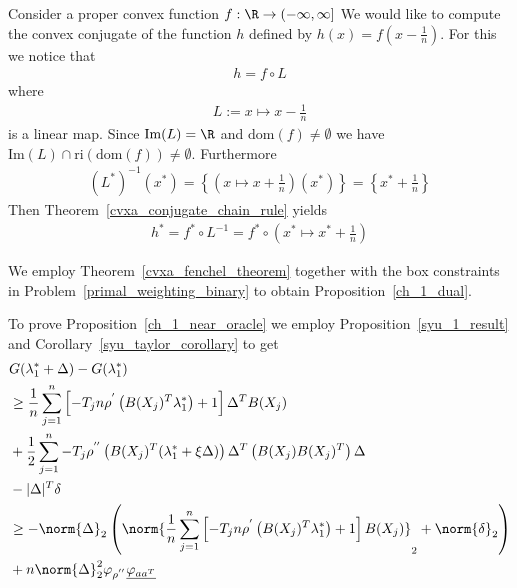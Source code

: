 \begin{example}
  Consider a proper convex function
  $
    f:
    \R \to ( -\infty, \infty]
  $
  We would like to compute the convex conjugate of the function 
  $h$ defined by 
  $
    h(x) = f \left( x - \frac{1}{n} \right)
  $.
  For this we notice that
  \begin{gather*}
    h = f \circ L
  \end{gather*}
  where 
  \begin{gather*}
   L := x \mapsto x - \frac{1}{n} 
  \end{gather*}
  is a linear map.
  Since 
  $
    \text{Im}(L) = \R
  $
  and 
  $\text{dom}(f) \neq \emptyset$
  we have
  $
    \text{Im}(L) 
    \cap
    \text{ri}(\text{dom}(f) )
    \neq
    \emptyset
  $.
  Furthermore
  \begin{gather}
    (L^*)^{-1}(x^*)
    =
    \left\{ 
     \left( x \mapsto x + \frac{1}{n} \right) (x^*)
    \right\}
    =
    \left\{ x^* + \frac{1}{n} \right\}
  \end{gather}
  Then Theorem~\ref{cvxa_conjugate_chain_rule}
  yields
  \begin{gather}
    h^* = f^* \circ L^{-1} 
        =  f^* \circ  
        \left( x^* \mapsto x^* + \frac{1}{n} \right)
  \end{gather}

\end{example}

We employ 
Theorem~\ref{cvxa_fenchel_theorem}
together with the box constraints in 
Problem~\eqref{primal_weighting_binary}
to obtain Proposition~\ref{ch_1_dual}.

To prove Proposition~\ref{ch_1_near_oracle}
we employ
Proposition~\ref{syu_1_result}
and 
Corollary~\ref{syu_taylor_corollary}
to get
\begin{align}
  \begin{split}
    & 
    G(\lambda^*_1 + \Delta) 
    -
    G(\lambda^*_1)
\\
    &\ge
    \frac{1}{n}
    \sum_{j = 1}^{n} 
      \left[ 
        -T_j n 
        \rho^{'} 
        \left( 
          B(X_j)^T \lambda^*_1
        \right)
        +
        1
      \right]
      \Delta^T B(X_j)
\\
    & +
    \frac{1}{2}
    \sum_{j = 1}^{n} 
      -T_j  
      \rho^{''} 
      \left( 
        B(X_j)^T 
        (
          \lambda^*_1 + \xi \Delta
        )
      \right)
      \Delta^T
      \left( 
        B(X_j)
        B(X_j)^T
      \right)
      \Delta
\\
    &-
    |\Delta|^T \delta
\\
    &\ge
    - \norm{\Delta}_2
    \left( 
      \norm{
        \frac{1}{n}
        \sum_{j = 1}^{n} 
          \left[ 
            -T_j n 
            \rho^{'} 
            \left( 
              B(X_j)^T \lambda^*_1
            \right)
            +
            1
          \right]
        B(X_j)
      }_2
      +
      \norm{\delta}_2
    \right)
\\
    &+
    n
    \norm{\Delta}^2_2
    \varphi_{\rho^{''}}
    \underline{\varphi_{aa^T}}
  \end{split}
\end{align}

